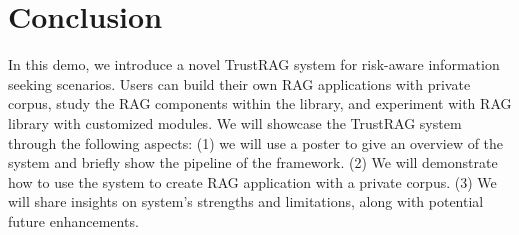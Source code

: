 \section{Conclusion}
In this demo, we introduce a novel TrustRAG system for risk-aware information seeking scenarios. Users can build their own \ac{RAG} applications with private corpus, study the \ac{RAG} components within the library, and experiment with \ac{RAG} library with customized modules. 
We will showcase the TrustRAG system through the following aspects: (1) we will use a poster to give an overview of the system and briefly show the pipeline of the framework. (2) We will demonstrate how to use the system to create \ac{RAG} application with a private corpus. (3) We will share insights on system's strengths and limitations, along with potential future enhancements.
